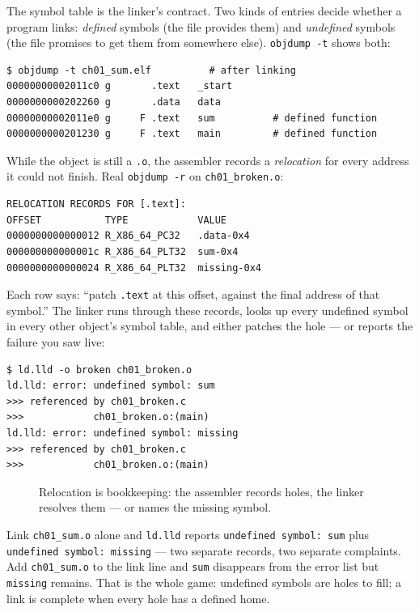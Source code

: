 The symbol table is the linker's contract. Two kinds of entries decide
whether a program links: \emph{defined} symbols (the file provides them)
and \emph{undefined} symbols (the file promises to get them from
somewhere else). \texttt{objdump -t} shows both:

\begin{lstlisting}[basicstyle=\ttfamily\scriptsize]
$ objdump -t ch01_sum.elf          # after linking
00000000002011c0 g       .text   _start
0000000000202260 g       .data   data
00000000002011e0 g     F .text   sum          # defined function
0000000000201230 g     F .text   main         # defined function
\end{lstlisting}

While the object is still a \texttt{.o}, the assembler records a
\emph{relocation} for every address it could not finish. Real
\texttt{objdump -r} on \texttt{ch01\_broken.o}:

\begin{lstlisting}[basicstyle=\ttfamily\scriptsize]
RELOCATION RECORDS FOR [.text]:
OFFSET           TYPE            VALUE
0000000000000012 R_X86_64_PC32   .data-0x4
000000000000001c R_X86_64_PLT32  sum-0x4
0000000000000024 R_X86_64_PLT32  missing-0x4
\end{lstlisting}

Each row says: ``patch \texttt{.text} at this offset, against the
final address of that symbol.'' The linker runs through these records,
looks up every undefined symbol in every other object's symbol table,
and either patches the hole --- or reports the failure you saw live:

\begin{lstlisting}[basicstyle=\ttfamily\scriptsize]
$ ld.lld -o broken ch01_broken.o
ld.lld: error: undefined symbol: sum
>>> referenced by ch01_broken.c
>>>            ch01_broken.o:(main)
ld.lld: error: undefined symbol: missing
>>> referenced by ch01_broken.c
>>>            ch01_broken.o:(main)
\end{lstlisting}

\begin{figure}[htbp]
\centering

\caption{Relocation is bookkeeping: the assembler records holes, the
linker resolves them --- or names the missing symbol.}
\label{fig:reloc01}
\end{figure}

\begin{example}
\label{ex:handlink}
Link \texttt{ch01\_sum.o} alone and \texttt{ld.lld} reports
\texttt{undefined symbol: sum} plus \texttt{undefined symbol: missing} ---
two separate records, two separate complaints. Add \texttt{ch01\_sum.o}
to the link line and \texttt{sum} disappears from the error list but
\texttt{missing} remains. That is the whole game: undefined symbols are
holes to fill; a link is complete when every hole has a defined home.
\end{example}

